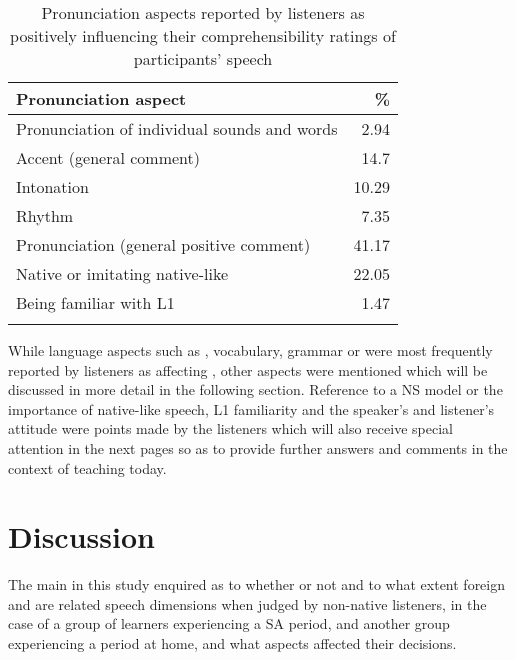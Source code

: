 \documentclass[output=paper]{langsci/langscibook}
\begin{document}
\begin{table}
\caption{Pronunciation aspects reported by listeners as positively influencing their comprehensibility ratings of participants’ speech}
\label{tab:delrio:6}

\begin{tabularx}{\textwidth}{Qr}
\lsptoprule
\bfseries Pronunciation aspect & \bfseries \%\\
\midrule 
Pronunciation of individual sounds and words & 2.94\\
Accent (general comment) & 14.7\\
Intonation & 10.29\\
Rhythm & 7.35\\
Pronunciation (general positive comment) & 41.17\\
Native or imitating native-like  & 22.05\\
Being familiar with {L1}  & 1.47 \\
\lspbottomrule
\end{tabularx}
\end{table}

\newpage 
While language aspects such as , vocabulary, grammar or  were most frequently reported by listeners as affecting , other aspects were mentioned which will be discussed in more detail in the following section. Reference to a NS model or the importance of native-like speech, {L1} familiarity and the speaker’s and listener’s attitude were points made by the listeners which will also receive special attention in the next pages so as to provide further answers and comments in the context of   teaching today.


\section{Discussion}

The main  in this study enquired as to whether or not and to what extent foreign  and  are related speech dimensions when judged by non-native listeners, in the case of a group of  learners experiencing a SA period, and another group experiencing a  period at home, and what aspects affected their decisions. 
\end{document}
